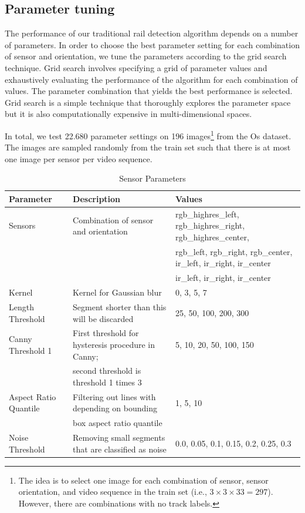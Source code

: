 \documentclass[Master,MDS,english]{BASE/twbook} %
\begin{document}
\subsection{Parameter tuning} \label{sec:fld_parameter}

The performance of our traditional rail detection algorithm depends on a number of parameters. In order to choose the best parameter setting for each combination of sensor and orientation, we tune the parameters according to the grid search technique. Grid search involves specifying a grid of parameter values and exhaustively evaluating the performance of the algorithm for each combination of values. The parameter combination that yields the best performance is selected. Grid search is a simple technique that thoroughly   explores the parameter space but it is also computationally expensive in multi-dimensional spaces.

In total, we test 22.680 parameter settings on 196 images\footnote{The idea is to select one image for each combination of sensor, sensor orientation, and video sequence in the train set (i.e., $3\times3\times33 = 297$). However, there are combinations with no track labels.} from the Os dataset. The images are sampled randomly from the train set such that there is at most one image per sensor per video sequence. 
 
\begin{table}[htbp]
    \centering
    \tiny
    \caption{Sensor Parameters}
    \label{tab:sensor_parameters}
    \begin{tabular}{|@{}lll@{}|}
        \hline
        \textbf{Parameter} & \textbf{Description} & \textbf{Values} \\
        \hline
        Sensors & Combination of sensor and orientation & rgb\_highres\_left, rgb\_highres\_right, rgb\_highres\_center,  \\
                & & rgb\_left, rgb\_right, rgb\_center, ir\_left, ir\_right, ir\_center \\
                 & &  ir\_left, ir\_right, ir\_center \\
        \hline
        Kernel & Kernel for Gaussian blur & 0, 3, 5, 7 \\
        \hline
        Length Threshold & Segment shorter than this will be discarded & 25, 50, 100, 200, 300 \\
        \hline
        Canny Threshold 1 & First threshold for hysteresis procedure in Canny;  & 5, 10, 20, 50, 100, 150 \\
         & second threshold is threshold 1 times 3 &  \\
        \hline
        Aspect Ratio Quantile & Filtering out lines with depending on bounding  & 1, 5, 10 \\
          &  box aspect ratio quantile &  \\
        \hline
        Noise Threshold & Removing small segments that are classified as noise & 0.0, 0.05, 0.1, 0.15, 0.2, 0.25, 0.3 \\
        \hline
    \end{tabular}
\end{table}
\end{document}
